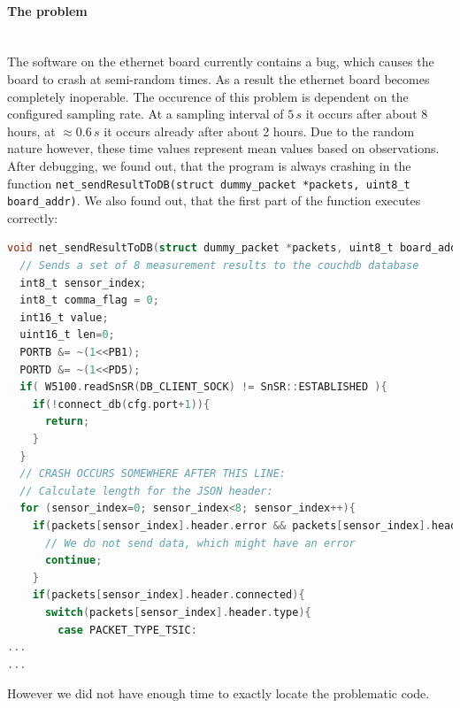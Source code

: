 \documentclass[a4paper]{scrreprt}
\begin{document}
\paragraph{The problem}\hspace{1cm}\\
The software on the ethernet board currently contains a bug, which causes the board to
crash at semi-random times. As a result the ethernet board becomes completely inoperable.
The occurence of this problem is dependent on the configured sampling rate. At a sampling
interval of $5\,s$ it occurs after about 8 hours, at $\approx0.6\,s$ it occurs already after about
2 hours. Due to the random nature however, these time values represent mean values based on
observations.\\
After debugging, we found out, that the program is always crashing in the function
\texttt{net\_sendResultToDB(struct dummy\_packet *packets, uint8\_t board\_addr)}. We also found out, that the first part of the function executes correctly:
\lstset{style=customc}
\begin{lstlisting}[language=C, framextopmargin=10pt, framexbottommargin=10pt]
void net_sendResultToDB(struct dummy_packet *packets, uint8_t board_addr){
  // Sends a set of 8 measurement results to the couchdb database
  int8_t sensor_index;
  int8_t comma_flag = 0;
  int16_t value;
  uint16_t len=0;
  PORTB &= ~(1<<PB1);
  PORTD &= ~(1<<PD5);
  if( W5100.readSnSR(DB_CLIENT_SOCK) != SnSR::ESTABLISHED ){
    if(!connect_db(cfg.port+1)){
      return;
    }
  }
  // CRASH OCCURS SOMEWHERE AFTER THIS LINE:
  // Calculate length for the JSON header:
  for (sensor_index=0; sensor_index<8; sensor_index++){
    if(packets[sensor_index].header.error && packets[sensor_index].header.connected){
      // We do not send data, which might have an error
      continue;
    }
    if(packets[sensor_index].header.connected){
      switch(packets[sensor_index].header.type){
        case PACKET_TYPE_TSIC:
...
...
\end{lstlisting}
However we did not have enough time to exactly locate the problematic code.
\end{document}
